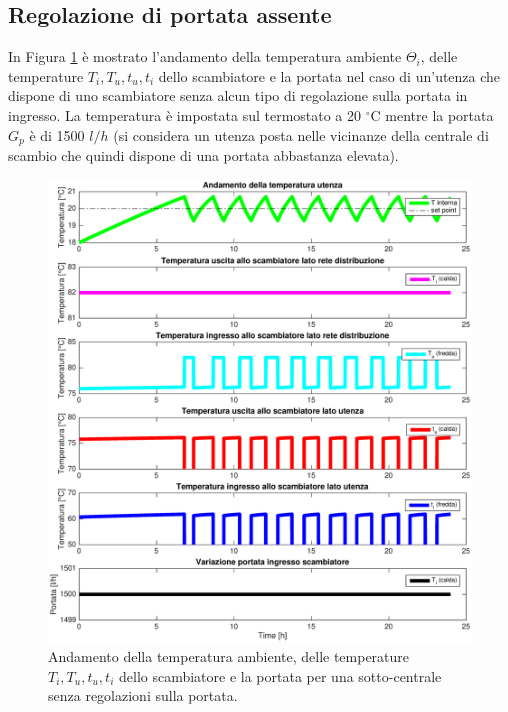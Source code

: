 \documentclass[laurea,oneside,11pt]{USiena_tesiLM3}
\begin{document}
\subsection{Regolazione di portata assente}
In Figura \ref{fig:no_reg} è mostrato l'andamento della temperatura ambiente $\Theta_i$, delle temperature $T_i, T_u, t_u, t_i$ dello scambiatore e la portata nel caso di un'utenza che dispone di uno scambiatore senza alcun tipo di regolazione sulla portata in ingresso. La temperatura è impostata sul termostato a 20 $^{\circ}$C mentre la portata $G_p$ è di 1500 $l/h$ (si considera un utenza posta nelle vicinanze della centrale di scambio che quindi dispone di una portata abbastanza elevata). 

\begin{figure}[!ht]
\centering
\includegraphics[width=\textwidth]{figure/no_reg} 
\caption{Andamento della temperatura ambiente, delle temperature $T_i, T_u, t_u, t_i$  dello scambiatore e la portata per una sotto-centrale senza regolazioni sulla portata.}
\label{fig:no_reg}
\end{figure}
\end{document}
